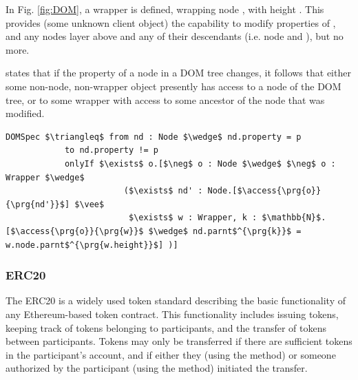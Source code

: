 In  Fig. \ref{fig:DOM}, a wrapper  is defined, wrapping node , with 
height . This provides  (some unknown client object) the capability to modify 
properties of , and any nodes  layer above and any of their descendants (i.e. node  and ), but no more.



 states that if the property of a node in a DOM tree changes,
it follows that either some non-node, non-wrapper object presently has 
access to a node of the DOM tree, or to some wrapper with access to some 
ancestor of the node that was modified.
\begin{lstlisting}[language = Chainmail, mathescape=true, frame=lines]
DOMSpec $\triangleq$ from nd : Node $\wedge$ nd.property = p
            to nd.property != p
            onlyIf $\exists$ o.[$\neg$ o : Node $\wedge$ $\neg$ o : Wrapper $\wedge$ 
                        ($\exists$ nd' : Node.[$\access{\prg{o}}{\prg{nd'}}$] $\vee$ 
                         $\exists$ w : Wrapper, k : $\mathbb{N}$.[$\access{\prg{o}}{\prg{w}}$ $\wedge$ nd.parnt$^{\prg{k}}$ = w.node.parnt$^{\prg{w.height}}$] )]
\end{lstlisting}

\subsubsection{ERC20}
The ERC20\cite{ERC20} is a widely used token standard describing the basic functionality of any Ethereum-based token 
contract. This functionality includes issuing tokens, keeping track of tokens belonging to participants, and the 
transfer of tokens between participants. Tokens may only be transferred if there are sufficient tokens in the 
participant's account, and if either they (using the  method) or someone authorized by the participant (using the  method) initiated the transfer. 

